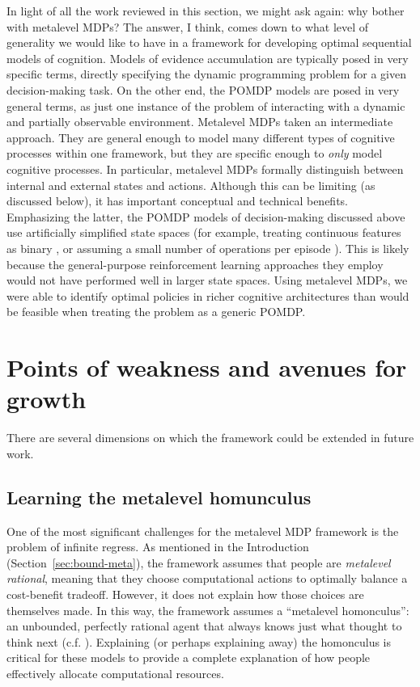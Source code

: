In light of all the work reviewed in this section, we might ask again: why bother with metalevel MDPs? The answer, I think, comes down to what level of generality we would like to have in a framework for developing optimal sequential models of cognition. Models of evidence accumulation are typically posed in very specific terms, directly specifying the dynamic programming problem for a given decision-making task. On the other end, the POMDP models are posed in very general terms, as just one instance of the problem of interacting with a dynamic and partially observable environment. Metalevel MDPs taken an intermediate approach. They are general enough to model many different types of cognitive processes within one framework, but they are specific enough to \emph{only} model cognitive processes. In particular, metalevel MDPs formally distinguish between internal and external states and actions. Although this can be limiting (as discussed below), it has important conceptual and technical benefits. Emphasizing the latter, the POMDP models of decision-making discussed above use artificially simplified state spaces (for example, treating continuous features as binary \citealp{chen2017cognitive}, or assuming a small number of operations per episode \citealp{chen2021apparently}). This is likely because the general-purpose reinforcement learning approaches they employ would not have performed well in larger state spaces. Using metalevel MDPs, we were able to identify optimal policies in richer cognitive architectures than would be feasible when treating the problem as a generic POMDP.

\section{Points of weakness and avenues for growth}

There are several dimensions on which the framework could be extended in future work.

\subsection{Learning the metalevel homunculus}\label{sec:homonculus}

One of the most significant challenges for the metalevel MDP framework is the problem of infinite regress. As mentioned in the Introduction (Section~\ref{sec:bound-meta}), the framework assumes that people are \emph{metalevel rational}, meaning that they choose computational actions to optimally balance a cost-benefit tradeoff. However, it does not explain how those choices are themselves made. In this way, the framework assumes a ``metalevel homonculus'': an unbounded, perfectly rational agent that always knows just what thought to think next (c.f. \citealp{hazy2006banishing,botvinick2014computational}). Explaining (or perhaps explaining away) the homonculus is critical for these models to provide a complete explanation of how people effectively allocate computational resources.

